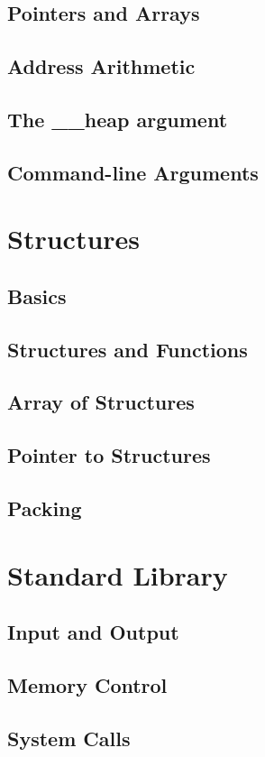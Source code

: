 \documentclass{scrartcl}
\begin{document}
        \subsection{Pointers and Arrays}
        \subsection{Address Arithmetic}
        \subsection{The \_\_heap argument}
        \subsection{Command-line Arguments}
    \section{Structures}
        \subsection{Basics}
        \subsection{Structures and Functions}
        \subsection{Array of Structures}
        \subsection{Pointer to Structures}
        \subsection{Packing}
    \section{Standard Library}
        \subsection{Input and Output}
        \subsection{Memory Control}
        \subsection{System Calls}
\end{document}
